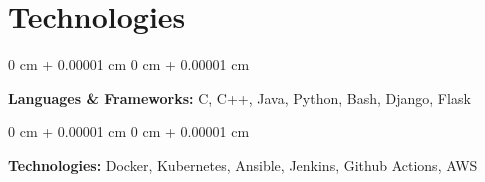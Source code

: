 \documentclass[10pt, letterpaper]{article}
\newenvironment{onecolentry}{
	\begin{adjustwidth}{
			0 cm + 0.00001 cm
		}{
			0 cm + 0.00001 cm
		}
	}{
	\end{adjustwidth}
} %
\begin{document}
	
	
	
	
	
	\section{Technologies}
	
	
	
	
	\begin{onecolentry}
        \textbf{Languages \& Frameworks:} C, C++, Java, Python, Bash, Django, Flask
	\end{onecolentry}
	
	\vspace{0.2 cm}
	
	\begin{onecolentry}
		\textbf{Technologies:} Docker, Kubernetes, Ansible, Jenkins, Github Actions, AWS
	\end{onecolentry}

	
	
\end{document}
